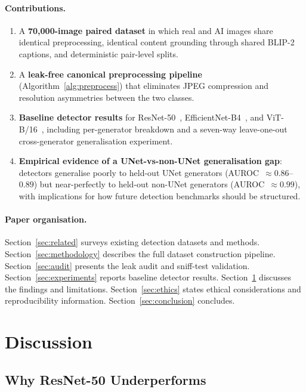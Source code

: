 \paragraph{Contributions.}
\begin{enumerate}[leftmargin=1.2em, itemsep=1pt]
\item A \textbf{70{,}000-image paired dataset} in which real and AI
  images share identical preprocessing, identical content grounding
  through shared BLIP-2 captions, and deterministic pair-level splits.
\item A \textbf{leak-free canonical preprocessing pipeline}
  (Algorithm~\ref{alg:preprocess}) that eliminates JPEG compression
  and resolution asymmetries between the two classes.
\item \textbf{Baseline detector results} for
  ResNet-50~\cite{he2016resnet},
  EfficientNet-B4~\cite{tan2019efficientnet}, and
  ViT-B/16~\cite{dosovitskiy2021vit}, including per-generator breakdown
  and a seven-way leave-one-out cross-generator generalisation
  experiment.
\item \textbf{Empirical evidence of a UNet-vs-non-UNet
  generalisation gap}: detectors generalise poorly to held-out UNet
  generators (AUROC~$\approx 0.86$--$0.89$) but near-perfectly to
  held-out non-UNet generators (AUROC~$\approx 0.99$), with
  implications for how future detection benchmarks should be structured.
\end{enumerate}

\paragraph{Paper organisation.}
Section~\ref{sec:related} surveys existing detection datasets and
methods.
Section~\ref{sec:methodology} describes the full dataset construction
pipeline.
Section~\ref{sec:audit} presents the leak audit and sniff-test
validation.
Section~\ref{sec:experiments} reports baseline detector results.
Section~\ref{sec:discussion} discusses the findings and limitations.
Section~\ref{sec:ethics} states ethical considerations and
reproducibility information.
Section~\ref{sec:conclusion} concludes.


\section{Discussion}
\label{sec:discussion}

\subsection{Why ResNet-50 Underperforms}
\label{ssec:disc_resnet}

